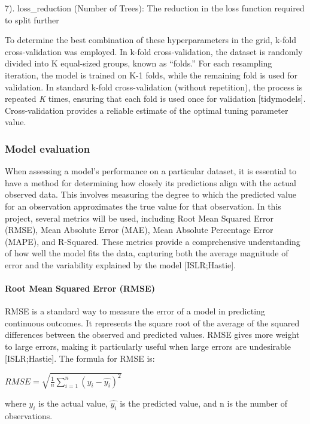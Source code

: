 \documentclass[11pt,a4paper,]{article}
\begin{document}
7). loss\_reduction (Number of Trees): The reduction in the loss function required to split further

To determine the best combination of these hyperparameters in the grid, k-fold cross-validation was employed. In k-fold cross-validation, the dataset is randomly divided into K equal-sized groups, known as ``folds.'' For each resampling iteration, the model is trained on K-1 folds, while the remaining fold is used for validation. In standard k-fold cross-validation (without repetition), the process is repeated \emph{K} times, ensuring that each fold is used once for validation {[}tidymodels{]}. Cross-validation provides a reliable estimate of the optimal tuning parameter value.

\subsubsection{Model evaluation}\label{model-evaluation}

When assessing a model's performance on a particular dataset, it is essential to have a method for determining how closely its predictions align with the actual observed data. This involves measuring the degree to which the predicted value for an observation approximates the true value for that observation. In this project, several metrics will be used, including Root Mean Squared Error (RMSE), Mean Absolute Error (MAE), Mean Absolute Percentage Error (MAPE), and R-Squared. These metrics provide a comprehensive understanding of how well the model fits the data, capturing both the average magnitude of error and the variability explained by the model {[}ISLR;Hastie{]}.

\paragraph{Root Mean Squared Error (RMSE)}\label{root-mean-squared-error-rmse}

RMSE is a standard way to measure the error of a model in predicting continuous outcomes. It represents the square root of the average of the squared differences between the observed and predicted values. RMSE gives more weight to large errors, making it particularly useful when large errors are undesirable {[}ISLR;Hastie{]}. The formula for RMSE is:

\(RMSE = \sqrt{\frac{1}{n} {\sum^n_{i=1}(y_i-\hat{y_i})^2}}\)

where \(y_i\) is the actual value, \(\hat{y_i}\) is the predicted value, and n is the number of observations.
\end{document}
